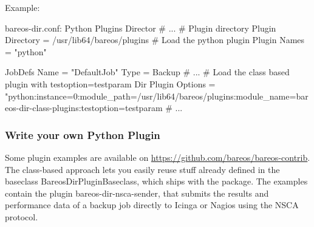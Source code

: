Example:

\begin{bconfig}{bareos-dir.conf: Python Plugins}
Director {
  # ...
  # Plugin directory
  Plugin Directory = /usr/lib64/bareos/plugins
  # Load the python plugin
  Plugin Names = "python"
}

JobDefs {
  Name = "DefaultJob"
  Type = Backup
  # ...
  # Load the class based plugin with testoption=testparam
  Dir Plugin Options = "python:instance=0:module_path=/usr/lib64/bareos/plugins:module_name=bareos-dir-class-plugins:testoption=testparam
  # ...
}
\end{bconfig}

\subsubsection{Write your own Python Plugin}

Some plugin examples are available on \url{https://github.com/bareos/bareos-contrib}. 
The class-based approach lets you easily reuse stuff already
defined in the baseclass BareosDirPluginBaseclass, which ships with the  package.
The examples contain the plugin bareos-dir-nsca-sender, that submits the results and performance data of a backup job directly to Icinga or Nagios using the NSCA protocol.
